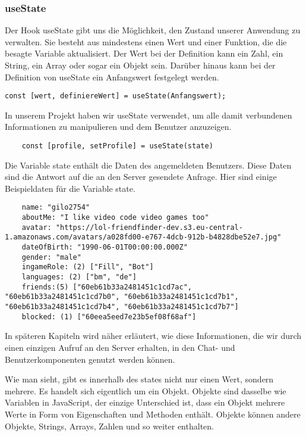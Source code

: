 \subsubsection{useState}
Der Hook useState gibt uns die Möglichkeit, den Zustand unserer Anwendung zu verwalten. Sie besteht aus mindestens einen Wert und einer Funktion, die die besagte Variable aktualisiert.
Der Wert bei der Definition kann ein Zahl, ein String, ein Array oder sogar ein Objekt sein.
Darüber hinaus kann bei der Definition von useState ein Anfangswert festgelegt werden.

\begin{lstlisting}
const [wert, definiereWert] = useState(Anfangswert);
\end{lstlisting}

In unserem Projekt haben wir useState verwendet, um alle damit verbundenen Informationen zu manipulieren und dem Benutzer anzuzeigen.
\begin{lstlisting}
    const [profile, setProfile] = useState(state)    
    \end{lstlisting}

\newpage
Die Variable state enthält die Daten des angemeldeten Benutzers. Diese Daten sind die Antwort auf die an den Server gesendete Anfrage. 
Hier sind einige Beispieldaten für die Variable state.

\begin{lstlisting}
    name: "gilo2754"
    aboutMe: "I like video code video games too"
    avatar: "https://lol-friendfinder-dev.s3.eu-central-1.amazonaws.com/avatars/a028fd00-e767-4dcb-912b-b4828dbe52e7.jpg"
    dateOfBirth: "1990-06-01T00:00:00.000Z"
    gender: "male"
    ingameRole: (2) ["Fill", "Bot"]
    languages: (2) ["bm", "de"]
    friends:(5) ["60eb61b33a2481451c1cd7ac", "60eb61b33a2481451c1cd7b0", "60eb61b33a2481451c1cd7b1", "60eb61b33a2481451c1cd7b4", "60eb61b33a2481451c1cd7b7"]
    blocked: (1) ["60eea5eed7e23b5ef08f68af"]
\end{lstlisting}
In späteren Kapiteln wird näher erläutert, wie diese Informationen, die wir durch einen einzigen Aufruf an den Server erhalten, in den Chat- und Benutzerkomponenten genutzt werden können. 

Wie man sieht, gibt es innerhalb des states nicht nur einen Wert, sondern mehrere.
Es handelt sich eigentlich um ein Objekt. Objekte sind dasselbe wie Variablen in JavaScript, der einzige Unterschied ist, dass ein Objekt mehrere Werte in Form von Eigenschaften und Methoden enthält.
Objekte können andere Objekte, Strings, Arrays, Zahlen und so weiter enthalten.
\newpage

